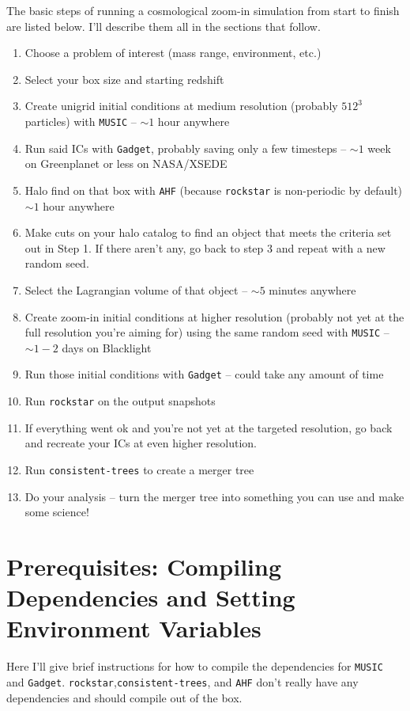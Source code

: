 \documentclass[10pt,a4paper,onecolumn]{article}
\begin{document}
The basic steps of running a cosmological zoom-in simulation from start to finish are
listed below.  I'll describe them all in the sections that follow.
\begin{enumerate}
\item Choose a problem of interest (mass range, environment, etc.)
\item Select your box size and starting redshift
\item Create unigrid initial conditions at medium resolution (probably $512 ^3$ particles) 
with \texttt{MUSIC} -- $\sim1$ hour anywhere
\item Run said ICs with \texttt{Gadget}, probably saving only a few timesteps -- $\sim1$ 
week on Greenplanet or less on NASA/XSEDE
\item Halo find on that box with \texttt{AHF} (because  \texttt{rockstar} is non-periodic 
by default) $\sim1$ hour anywhere
\item Make cuts on your halo catalog to find an object that meets the criteria set out in Step 1. 
 If there aren't any, go back to step 3 and repeat with a new random seed.
\item Select the Lagrangian volume of that object -- $\sim5$ minutes anywhere
\item Create zoom-in initial conditions at higher resolution (probably not yet at the full 
resolution you're aiming for) using the same random seed with \texttt{MUSIC} -- $\sim1-2$ days on Blacklight
\item Run those initial conditions with \texttt{Gadget} -- could take any amount of time
\item Run \texttt{rockstar} on the output snapshots
\item If everything went ok and you're not yet at the targeted resolution, go back and recreate your
ICs at even higher resolution.
\item Run \texttt{consistent-trees} to create a merger tree
\item Do your analysis -- turn the merger tree into something you can use and make some science!
\end{enumerate}

\section{Prerequisites:  Compiling Dependencies and Setting Environment Variables}
Here I'll give brief instructions for how to compile the dependencies for \texttt{MUSIC}
and \texttt{Gadget}.  \texttt{rockstar},\texttt{consistent-trees}, and \texttt{AHF} don't 
really have any dependencies and should compile out of the box.
\end{document}

